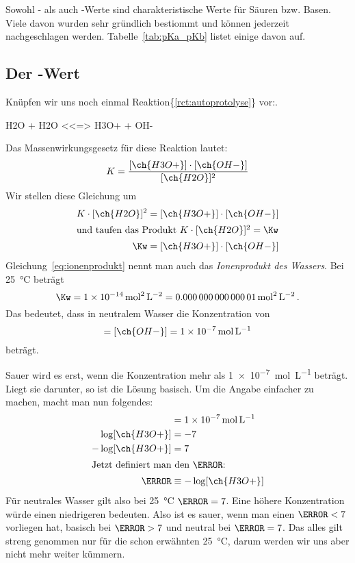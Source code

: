 \documentclass{scrartcl}
\newcommand*\rctref[1]{\{\ref{#1}\}}
\begin{document}
Sowohl \pKa- als auch \pKb-Werte sind charakteristische Werte für Säuren
bzw. Basen.  Viele davon wurden sehr gründlich bestiommt und können jederzeit
nachgeschlagen werden.  Tabelle~\ref{tab:pKa_pKb} listet einige davon auf.

\subsection{Der \pH-Wert}
Knüpfen wir uns noch einmal Reaktion\rctref{rct:autoprotolyse} vor:.
\begin{reaction*}
  H2O + H2O <<=> H3O+ + OH-
\end{reaction*}
Das Massenwirkungsgesetz für diese Reaktion lautet:
\begin{equation}
  K = \frac{ [\ch{H3O+}] \cdot [\ch{OH-}] }{ [\ch{H2O}]^2 }
\end{equation}
Wir stellen diese Gleichung um
\begin{align}
  K \cdot [\ch{H2O}]^2  &= [\ch{H3O+}] \cdot [\ch{OH-}] \\
  \intertext{und taufen das Produkt \(K \cdot [\ch{H2O}]^2 = \Kw\)}
  \Kw  &= [\ch{H3O+}] \cdot [\ch{OH-}] \label{eq:ionenprodukt}
\end{align}
Gleichung~\eqref{eq:ionenprodukt} nennt man auch das \emph{Ionenprodukt des
  Wassers}.  Bei \SI{25}{\celsius} beträgt
\[
  \Kw = \SI{1e-14}{\mole\squared\per\liter\squared}
      = \SI{0.00000000000001}{\mole\squared\per\liter\squared} \,.
\]
Das bedeutet, dass in neutralem Wasser die Konzentration von 
\begin{equation}
  [\ch{H3O+}] = [\ch{OH-}] = \SI{1e-7}{\mole\per\liter}
\end{equation}
beträgt.

Sauer wird es erst, wenn die Konzentration mehr als \SI{1e-7}{\mole\per\liter}
beträgt.  Liegt sie darunter, so ist die Lösung basisch.  Um die Angabe
einfacher zu machen, macht man nun folgendes:
\begin{align}
  [\ch{H3O+}]      &= \SI{1e-7}{\mole\per\liter} \\
  \log[\ch{H3O+}]  &= -7 \\
  -\log[\ch{H3O+}] &= 7 \\
  \intertext{Jetzt definiert man den \pH:}
  \pH &\equiv -\log[\ch{H3O+}] \label{eq:pH_definition}
\end{align}
Für neutrales Wasser gilt also bei \SI{25}{\celsius} $\pH = 7$.  Eine höhere
Konzentration würde einen niedrigeren \pH bedeuten.  Also ist es sauer, wenn
man einen $\pH < 7$ vorliegen hat, basisch bei $\pH > 7$ und neutral bei $\pH
= 7$.  Das alles gilt streng genommen nur für die schon erwähnten
\SI{25}{\celsius}, darum werden wir uns aber nicht mehr weiter kümmern.
\end{document}

